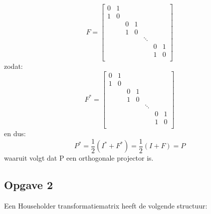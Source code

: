 \documentclass[een]{practicumverslag}
\begin{document}
\begin{equation}
	F = \begin{bmatrix}
		0 & 1 &  \\
  		1 & 0 &  \\
  		  &   & 0 & 1\\
  		  &   & 1 & 0\\
  		  &   &   &  & \ddots &  \\
  		  &   &   &  & 	 & 0 & 1 \\
  		  &   &   &  &   & 1 & 0 \\
		\end{bmatrix} 
\end{equation}
zodat:
\begin{equation}
		F^* = \begin{bmatrix}
		0 & 1 &  \\
  		1 & 0 &  \\
  		  &   & 0 & 1\\
  		  &   & 1 & 0\\
  		  &   &   &  & \ddots &  \\
  		  &   &   &  & 	 & 0 & 1 \\
  		  &   &   &  &   & 1 & 0 \\
		\end{bmatrix} 
\end{equation}
en dus: 
\begin{equation}
	P^* = \frac{1}{2}(I^* + F^*) = \frac{1}{2}(I + F) = P
\end{equation}
waaruit volgt dat P een orthogonale projector is.

\pagebreak


\subsection*{Opgave 2}

Een Householder transformatiematrix heeft de volgende structuur:
\end{document}
